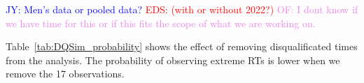 \documentclass[12pt, letterpaper]{article}
\newcommand{\jy}[1]{\textcolor{blue}{JY: #1}}
\newcommand{\eds}[1]{\textcolor{red}{EDS: (#1)}}
\newcommand{\of}[1]{\textcolor{violet}{OF: #1}}
\begin{document}
\jy{Men's data or pooled data?}
\eds{with or without 2022?}
\of{I dont know if we have time for this or if this fits the scope of what we
are working on.}

Table~\ref{tab:DQSim_probability} shows the effect of removing disqualificated
times from the analysis.  The probability of observing extreme RTs is lower when
we remove the 17 observations.



\end{document}

